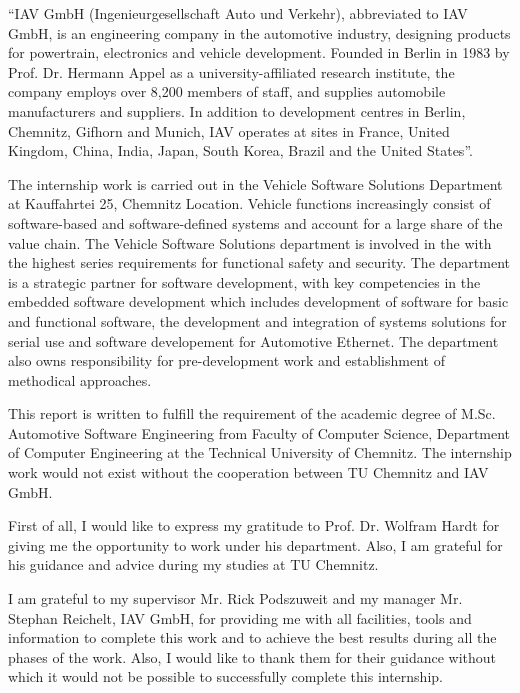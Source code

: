 \documentclass[a4paper, 12pt, oneside, BCOR1cm,toc=chapterentrywithdots]{scrbook}
\begin{document}
“IAV GmbH (Ingenieurgesellschaft Auto und Verkehr), abbreviated to IAV GmbH, is an engineering company in the automotive industry, designing products for powertrain, electronics and vehicle development. Founded in Berlin in 1983 by Prof. Dr. Hermann Appel as a university-affiliated research institute, the company employs over 8,200 members of staff, and supplies automobile manufacturers and suppliers. In addition to development centres in Berlin, Chemnitz, Gifhorn and Munich, IAV operates at sites in France, United Kingdom, China, India, Japan, South Korea, Brazil and the United States”.

The internship work is carried out in the Vehicle Software Solutions Department at Kauffahrtei 25, Chemnitz Location. Vehicle functions increasingly consist of software-based and software-defined systems and account for a large share of the value chain. The Vehicle Software Solutions department is involved in the with the highest series requirements for functional safety and security. The department is a strategic partner for software development, with key competencies in the embedded software development which includes development of software for basic and functional software, the development and integration of systems solutions for serial use and software developement for Automotive Ethernet. The department also owns responsibility for pre-development work and establishment of methodical approaches.

This report is written to fulfill the requirement of the academic degree of M.Sc. Automotive Software Engineering from Faculty of Computer Science, Department of Computer Engineering at the Technical University of Chemnitz. The internship work would not exist without the cooperation between TU Chemnitz and IAV GmbH.

First of all, I would like to express my gratitude to Prof. Dr. Wolfram Hardt for giving me the opportunity to work under his department. Also, I am grateful for his guidance and advice during my studies at TU Chemnitz.

I am grateful to my supervisor Mr. Rick Podszuweit and my manager Mr. Stephan Reichelt, IAV GmbH, for providing me with all facilities, tools and information to complete this work and to achieve the best results during all the phases of the work. Also, I would like to thank them for their guidance without which it would not be possible to successfully complete this internship.
\end{document}
